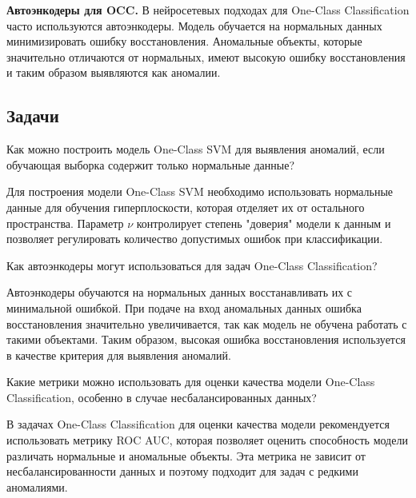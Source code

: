 \textbf{Автоэнкодеры для OCC.} В нейросетевых подходах для One-Class Classification часто используются автоэнкодеры. Модель обучается на нормальных данных минимизировать ошибку восстановления. Аномальные объекты, которые значительно отличаются от нормальных, имеют высокую ошибку восстановления и таким образом выявляются как аномалии.

\subsection{Задачи}

\problem Как можно построить модель One-Class SVM для выявления аномалий, если обучающая выборка содержит только нормальные данные?

\solution Для построения модели One-Class SVM необходимо использовать нормальные данные для обучения гиперплоскости, которая отделяет их от остального пространства. Параметр \( \nu \) контролирует степень "доверия" модели к данным и позволяет регулировать количество допустимых ошибок при классификации.

\problem Как автоэнкодеры могут использоваться для задач One-Class Classification?

\solution Автоэнкодеры обучаются на нормальных данных восстанавливать их с минимальной ошибкой. При подаче на вход аномальных данных ошибка восстановления значительно увеличивается, так как модель не обучена работать с такими объектами. Таким образом, высокая ошибка восстановления используется в качестве критерия для выявления аномалий.

\problem Какие метрики можно использовать для оценки качества модели One-Class Classification, особенно в случае несбалансированных данных?

\solution В задачах One-Class Classification для оценки качества модели рекомендуется использовать метрику ROC AUC, которая позволяет оценить способность модели различать нормальные и аномальные объекты. Эта метрика не зависит от несбалансированности данных и поэтому подходит для задач с редкими аномалиями.



